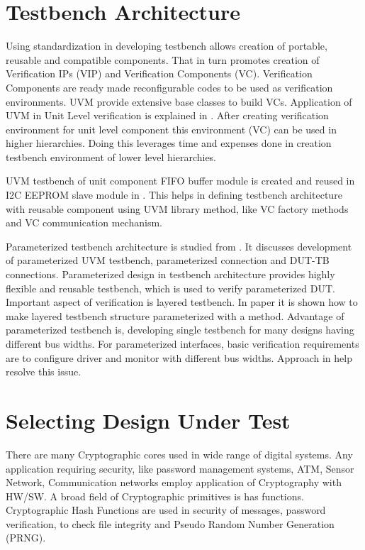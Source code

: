 \section{Testbench Architecture}

Using standardization in developing testbench allows creation of portable, reusable and compatible components. That in turn promotes creation of Verification IPs (VIP) and Verification Components (VC). Verification Components are ready made reconfigurable codes to be used as verification environments. UVM provide extensive base classes to build VCs. Application of UVM in Unit Level verification is explained in \cite{tbarch}. After creating verification environment for unit level component this environment (VC) can be used in higher hierarchies. Doing this leverages time and expenses done in creation testbench environment of lower level hierarchies. \par

UVM testbench of unit component FIFO buffer module is created and reused in I2C EEPROM slave module in \cite{tbarch}. This helps in defining testbench architecture with reusable component using UVM library method, like VC factory methods and VC communication mechanism. \par

Parameterized testbench architecture is studied from \cite{uvmparam}. It discusses development of parameterized UVM testbench, parameterized connection and DUT-TB connections. Parameterized design in testbench architecture provides highly flexible and reusable testbench, which is used to verify parameterized DUT. Important aspect of verification is layered testbench. In paper \cite{uvmparam} it is shown how to make layered testbench structure parameterized with a method. Advantage of parameterized testbench is, developing single testbench for many designs having different bus widths. For parameterized interfaces, basic verification requirements are to configure driver and monitor with different bus widths. Approach in \cite{uvmparam} help resolve this issue.

\section{Selecting Design Under Test}


There are many Cryptographic cores used in wide range of digital systems. Any application requiring security, like password management systems, ATM, Sensor Network, Communication networks employ application of Cryptography with HW/SW. A broad field of Cryptographic primitives is has functions. Cryptographic Hash Functions are used in security of messages, password verification, to check file integrity and Pseudo Random Number Generation (PRNG). \par

